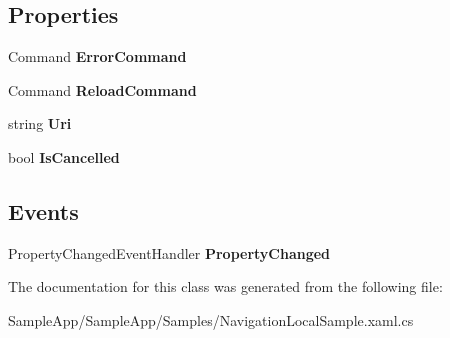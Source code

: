 \subsection*{Properties}
\begin{DoxyCompactItemize}
\item 
\mbox{\label{class_sample_app_1_1_samples_1_1_navigation_local_sample_1_1_navigation_events_view_model_aa6b12641f9a887571469199a08d74818}} 
Command {\bfseries Error\+Command}
\item 
\mbox{\label{class_sample_app_1_1_samples_1_1_navigation_local_sample_1_1_navigation_events_view_model_a4a25ef440b21a5e1f3541d2d709c83cc}} 
Command {\bfseries Reload\+Command}
\item 
\mbox{\label{class_sample_app_1_1_samples_1_1_navigation_local_sample_1_1_navigation_events_view_model_a899f26ad5c8847e068b6206e93cee9d1}} 
string {\bfseries Uri}
\item 
\mbox{\label{class_sample_app_1_1_samples_1_1_navigation_local_sample_1_1_navigation_events_view_model_a3111b050ea13d51979a4b61576941b37}} 
bool {\bfseries Is\+Cancelled}
\end{DoxyCompactItemize}
\subsection*{Events}
\begin{DoxyCompactItemize}
\item 
\mbox{\label{class_sample_app_1_1_samples_1_1_navigation_local_sample_1_1_navigation_events_view_model_a3a049ddb8818bf2e109a40b525ef4977}} 
Property\+Changed\+Event\+Handler {\bfseries Property\+Changed}
\end{DoxyCompactItemize}


The documentation for this class was generated from the following file\+:\begin{DoxyCompactItemize}
\item 
Sample\+App/\+Sample\+App/\+Samples/Navigation\+Local\+Sample.\+xaml.\+cs\end{DoxyCompactItemize}
